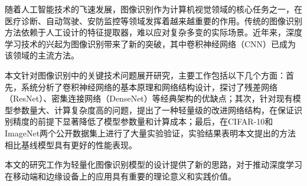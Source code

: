 \begin{cnabstract}

随着人工智能技术的飞速发展，图像识别作为计算机视觉领域的核心任务之一，在医疗诊断、自动驾驶、安防监控等领域发挥着越来越重要的作用。传统的图像识别方法依赖于人工设计的特征提取器，难以应对复杂多变的实际场景。近年来，深度学习技术的兴起为图像识别带来了新的突破，其中卷积神经网络（CNN）已成为该领域的主流方法。

本文针对图像识别中的关键技术问题展开研究，主要工作包括以下几个方面：首先，系统分析了卷积神经网络的基本原理和网络结构设计，探讨了残差网络（ResNet）、密集连接网络（DenseNet）等经典架构的优缺点；其次，针对现有模型参数量大、计算复杂度高的问题，提出了一种轻量级的改进网络结构，在保证识别精度的前提下显著降低了模型参数量和计算成本；最后，在CIFAR-10和ImageNet两个公开数据集上进行了大量实验验证，实验结果表明本文提出的方法相比基线模型具有更好的性能表现。

本文的研究工作为轻量化图像识别模型的设计提供了新的思路，对于推动深度学习在移动端和边缘设备上的应用具有重要的理论意义和实践价值。

\end{cnabstract}

